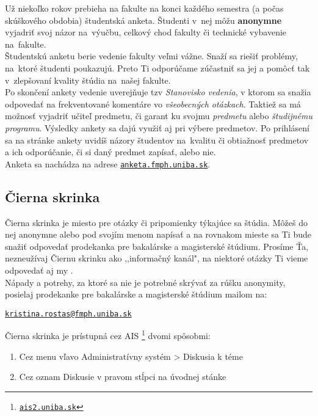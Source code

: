 Už niekoľko rokov prebieha na fakulte na konci každého semestra (a počas skúškového obdobia) študentská anketa.
Študenti v~nej môžu \textbf{anonymne} vyjadriť svoj názor na~výučbu, celkový chod fakulty 
či technické vybavenie na~fakulte. \\

Študentskú anketu berie vedenie fakulty veľmi vážne. Snaží sa riešiť
problémy, na~ktoré študenti poukazujú. Preto Ti odporúčame zúčastniť
sa jej a pomôcť tak v~zlepšovaní kvality štúdia na našej fakulte. \\

Po skončení ankety vedenie uverejňuje tzv \emph{Stanovisko vedenia}, v ktorom sa snažia odpovedať na frekventované komentáre vo \emph{všeobecných otázkach}. Taktiež sa má možnosť vyjadriť učiteľ predmetu, či garant ku svojmu \emph{predmetu} alebo \emph{študijnému programu}. Výsledky ankety sa dajú využiť aj pri výbere predmetov. Po prihlásení
sa na stránke ankety uvidíš názory študentov na~kvalitu či obtiažnosť predmetov a ich odporúčanie, či si daný predmet zapísať, alebo nie. \\

Anketa sa nachádza na adrese \href{https://anketa.fmph.uniba.sk}{\texttt{anketa.fmph.uniba.sk}}.

\subsection{Čierna skrinka} \label{subsec:4.1.2}

Čierna skrinka je miesto pre otázky či pripomienky týkajúce sa
štúdia. Môžeš do nej anonymne alebo pod svojím menom napísať a na rovnakom mieste sa Ti bude
snažiť odpovedať prodekanka pre bakalárske a magisterské štúdium. Prosíme Ťa, nezneužívaj Čiernu skrinku ako ,,informačný kanál", na niektoré otázky Ti vieme odpovedať aj my \Smiley.\\

Nápady a potrehy, za ktoré sa nie je potrebné skrývať za rúšku anonymity, posielaj prodekanke pre bakalárske a magisterské štúdium mailom na: 

\begin{center}
\href{mailto:kristina.rostas@fmph.uniba.sk}{\texttt{kristina.rostas@fmph.uniba.sk}}
\end{center}

Čierna skrinka je prístupná cez AIS%
\footnote{\href{https://ais2.uniba.sk}{\texttt{ais2.uniba.sk}}%
} dvomi spôsobmi: 
\begin{enumerate}\setlength\itemsep{1pt}
\item Cez menu vľavo Administratívny systém > Diskusia k téme 
\item Cez oznam \textquotedbl{}Diskusie\textquotedbl{} v pravom stĺpci na
úvodnej stánke
\end{enumerate}

